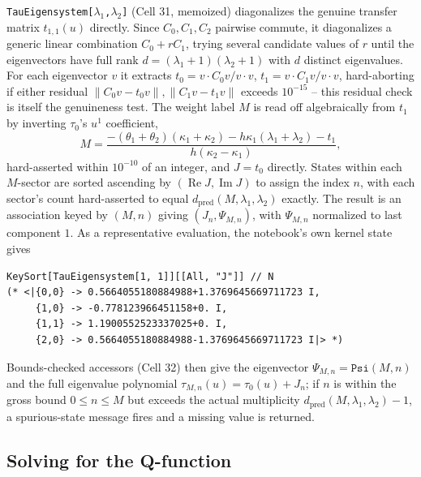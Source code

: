 \documentclass[11pt]{article}
\begin{document}
\texttt{TauEigensystem[$\lambda_1$,$\lambda_2$]} (Cell 31, memoized) diagonalizes the genuine
transfer matrix $t_{1,1}(u)$ directly. Since $C_0,C_1,C_2$ pairwise commute, it diagonalizes a
generic linear combination $C_0+rC_1$, trying several candidate values of $r$ until the eigenvectors
have full rank $d=(\lambda_1+1)(\lambda_2+1)$ with $d$ distinct eigenvalues. For each eigenvector
$v$ it extracts $t_0 = v\cdot C_0 v/v\cdot v$, $t_1 = v\cdot C_1 v/v\cdot v$, hard-aborting if either
residual $\|C_0v-t_0v\|,\|C_1v-t_1v\|$ exceeds $10^{-15}$ -- this residual check is itself the
genuineness test. The weight label $M$ is read off algebraically from $t_1$ by inverting $\tau_0$'s
$u^1$ coefficient,
\begin{equation}
  M = \frac{-(\theta_1+\theta_2)(\kappa_1+\kappa_2) - h\kappa_1(\lambda_1+\lambda_2) - t_1}
           {h(\kappa_2-\kappa_1)},
  \label{eq:Mextract}
\end{equation}
hard-asserted within $10^{-10}$ of an integer, and $J=t_0$ directly. States within each $M$-sector
are sorted ascending by $(\operatorname{Re}J,\operatorname{Im}J)$ to assign the index $n$, with
each sector's count hard-asserted to equal $d_{\mathrm{pred}}(M,\lambda_1,\lambda_2)$ exactly. The
result is an association keyed by $(M,n)$ giving $(J_n,\Psi_{M,n})$, with $\Psi_{M,n}$ normalized to
last component $1$. As a representative evaluation, the notebook's own kernel state gives
\begin{verbatim}
KeySort[TauEigensystem[1, 1]][[All, "J"]] // N
(* <|{0,0} -> 0.5664055180884988+1.3769645669711723 I,
     {1,0} -> -0.778123966451158+0. I,
     {1,1} -> 1.1900552523337025+0. I,
     {2,0} -> 0.5664055180884988-1.3769645669711723 I|> *)
\end{verbatim}

Bounds-checked accessors (Cell 32) then give the eigenvector $\Psi_{M,n}=\texttt{Psi}(M,n)$ and the
full eigenvalue polynomial $\tau_{M,n}(u)=\tau_0(u)+J_n$; if $n$ is within the gross bound
$0\le n\le M$ but exceeds the actual multiplicity $d_{\mathrm{pred}}(M,\lambda_1,\lambda_2)-1$, a
spurious-state message fires and a missing value is returned.

\subsection*{Solving for the Q-function}
\end{document}
